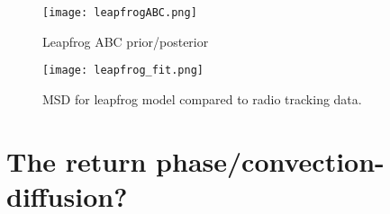\begin{figure} [h]
    \centering
        \texttt{[image: leapfrogABC.png]}
        \caption{Leapfrog ABC prior/posterior        }
    \label{fig:leapfrog_abc}
\end{figure}

\begin{figure} [h]
    \centering
        \texttt{[image: leapfrog\_fit.png]}
        \caption{MSD for leapfrog model compared to radio tracking data.
        }
    \label{fig:leapfrog_fit}
\end{figure}



\section{The return phase/convection-diffusion?}

